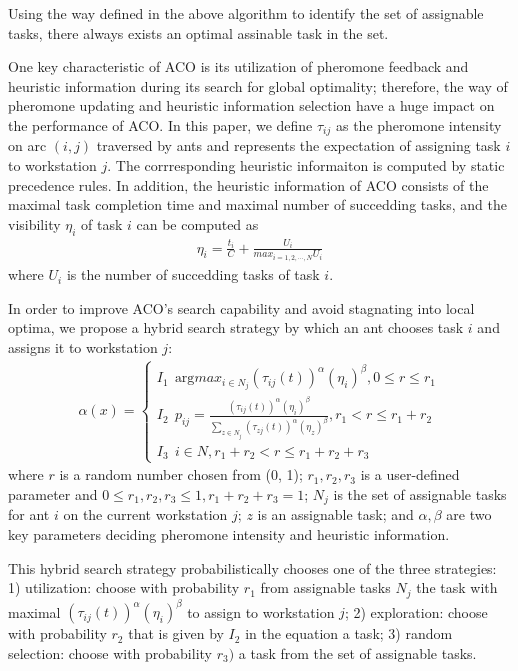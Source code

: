 Using the way defined in the above algorithm to identify the set of assignable tasks, there always exists an optimal assinable task in the set.

One key characteristic of ACO is its utilization of pheromone feedback and heuristic information during its search for global optimality; therefore, the way of pheromone updating and heuristic information selection have a huge impact on the performance of ACO.
In this paper, we define $\tau_{ij}$ as the pheromone intensity on arc $(i,j)$ traversed by ants and represents the expectation of assigning task $i$ to workstation $j$.
The corrresponding heuristic informaiton is computed by static precedence rules.
In addition, the heuristic information of ACO consists of the maximal task completion time and maximal number of succedding tasks, and the visibility $\eta_i$ of task $i$ can be computed as
\begin{align}
	\eta_i = \frac{t_i}{C} + \frac{U_i}{max_{i = 1, 2, \cdots, N}U_i}
\end{align}
where $U_i$ is the number of succedding tasks of task $i$.

In order to improve ACO's search capability and avoid stagnating into local optima, we propose a hybrid search strategy by which an ant chooses task $i$ and assigns it to workstation $j$:
\begin{align}
	\alpha(x)=\begin{cases}
	I_1 \ \ \text{arg} max_{i \in N_j}(\tau_{ij}(t))^{\alpha} (\eta_i)^{\beta}, 0 \leq r \leq r_1 \\
	I_2 \ \ p_{ij} = \frac{(\tau_{ij}(t))^{\alpha} (\eta_i)^{\beta}}{\sum_{z \in N_j}(\tau_{zj}(t))^{\alpha} (\eta_z)^{\beta}}, r_1 < r \leq r_1 + r_2 \\
	I_3 \ \ i \in N, r_1 + r_2 < r \leq r_1 + r_2 + r_3
	\end{cases} \label{formula7}
\end{align}
where $r$ is a random number chosen from (0, 1); $r_1, r_2, r_3$ is a user-defined parameter and $0 \leq r_1, r_2, r_3 \leq 1, r_1 + r_2 + r_3 = 1$; $N_j$ is the set of assignable tasks for ant $i$ on the current workstation $j$; $z$ is an assignable task; and $\alpha, \beta$ are two key parameters deciding pheromone intensity and heuristic information.

This hybrid search strategy probabilistically chooses one of the three strategies: 1) utilization: choose with probability $r_1$ from assignable tasks $N_j$ the task with maximal $(\tau_{ij}(t))^{\alpha} (\eta_i)^{\beta}$ to assign to workstation $j$; 2) exploration: choose with probability $r_2$ that is given by $I_2$ in the equation a task; 3) random selection: choose with probability $r_3)$ a task from the set of assignable tasks.

